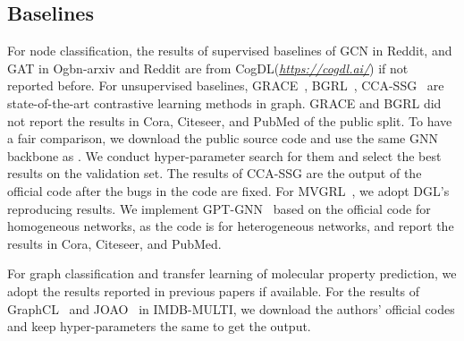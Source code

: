 {\subsection{Baselines}
For node classification, the results of supervised baselines of GCN in Reddit, and GAT in Ogbn-arxiv and Reddit are from CogDL(\textit{\url{https://cogdl.ai/}}) if not reported before. For unsupervised baselines, GRACE~\cite{zhu2020deep}, BGRL~\cite{thakoor2021bootstrapped}, CCA-SSG~\cite{zhang2021canonical} are state-of-the-art contrastive learning methods in graph. 
GRACE and BGRL did not report the results in Cora, Citeseer, and PubMed of the public split. To have a fair comparison, we download the public source code and use the same GNN backbone as \model. We conduct hyper-parameter search for them and select the best results on the validation set.
The results of CCA-SSG are the output of the official code after the bugs in the code are fixed. For MVGRL~\cite{hassani2020contrastive}, we adopt DGL's reproducing results. We implement GPT-GNN~\cite{hu2020gpt} based on the official code for homogeneous networks, as the code is for heterogeneous networks, and report the results in Cora, Citeseer, and PubMed. 

For graph classification and transfer learning of molecular property prediction, we adopt the results reported in previous papers if available. For the results of GraphCL~\cite{you2020graph} and JOAO~\cite{you2021graph} in IMDB-MULTI, we download the authors' official codes and keep hyper-parameters the same to get the output. }




